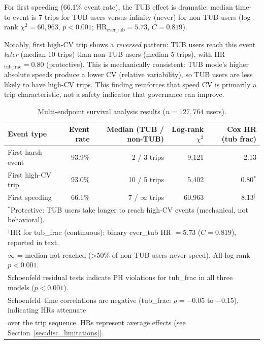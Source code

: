 For first speeding (66.1\% event rate), the TUB effect is dramatic: median time-to-event is 7 trips for TUB users versus infinity (never) for non-TUB users (log-rank $\chi^2 = 60{,}963$, $p < 0.001$; HR$_{\text{ever\_tub}} = 5.73$, $C = 0.819$).

Notably, first high-CV trip shows a \textit{reversed} pattern: TUB users reach this event \textit{later} (median 10 trips) than non-TUB users (median 5 trips), with HR$_{\text{tub\_frac}} = 0.80$ (protective). This is mechanically consistent: TUB mode's higher absolute speeds produce a lower CV (relative variability), so TUB users are less likely to have high-CV trips. This finding reinforces that speed CV is primarily a trip characteristic, not a safety indicator that governance can improve.

\begin{table}[htbp]
\centering
\caption{Multi-endpoint survival analysis results ($n = 127{,}764$ users).}
\label{tab:survival}
\small
\begin{tabular}{lrrrr}
\toprule
\textbf{Event type} & \textbf{Event rate} & \textbf{Median (TUB / non-TUB)} & \textbf{Log-rank $\chi^2$} & \textbf{Cox HR (tub frac)} \\
\midrule
First harsh event & 93.9\% & 2 / 3 trips & 9,121 & 2.13 \\
First high-CV trip & 93.0\% & 10 / 5 trips & 5,402 & 0.80$^*$ \\
First speeding & 66.1\% & 7 / $\infty$ trips & 60,963 & 8.13$^\ddagger$ \\
\bottomrule
\multicolumn{5}{l}{\footnotesize $^*$Protective: TUB users take longer to reach high-CV events (mechanical, not behavioral).} \\
\multicolumn{5}{l}{\footnotesize $^\ddagger$HR for tub\_frac (continuous); binary ever\_tub HR $= 5.73$ ($C = 0.819$), reported in text.} \\
\multicolumn{5}{l}{\footnotesize $\infty$ = median not reached (>50\% of non-TUB users never speed). All log-rank $p < 0.001$.} \\
\multicolumn{5}{l}{\footnotesize Schoenfeld residual tests indicate PH violations for tub\_frac in all three models ($p < 0.001$).} \\
\multicolumn{5}{l}{\footnotesize Schoenfeld--time correlations are negative (tub\_frac: $\rho = -0.05$ to $-0.15$), indicating HRs attenuate} \\
\multicolumn{5}{l}{\footnotesize over the trip sequence. HRs represent average effects (see Section~\ref{sec:disc_limitations}).} \\
\end{tabular}
\end{table}
